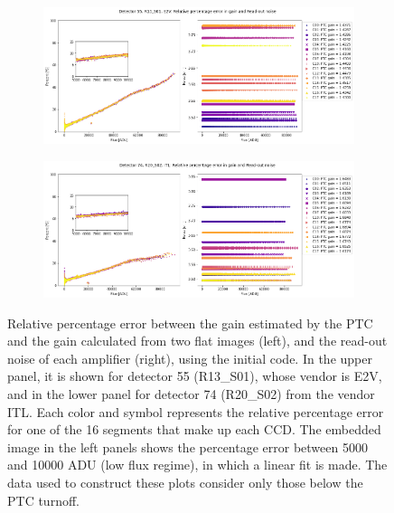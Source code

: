  \begin{figure}[!htb]
     \centering
     \begin{subfigure}[b]{\textwidth}
         \centering
         \includegraphics[width=\textwidth]{Figures/Relative_Error_Gain_Noise_detectorR13_S01_old.png}
     \end{subfigure}
     \vspace{3mm}
     \begin{subfigure}[b]{\textwidth}
         \centering
         \includegraphics[width=\textwidth]{Figures/Relative_Error_Gain_Noise_detectorR20_S02_old.png}
     \end{subfigure}
        \caption{Relative percentage error between the gain estimated by the PTC and the gain calculated from two flat images (left), and the read-out noise of each amplifier (right), using the initial code. In the upper panel, it is shown for detector 55 (R13\_S01), whose vendor is E2V, and in the lower panel for detector 74 (R20\_S02) from the vendor ITL. Each color and symbol represents the relative percentage error for one of the 16 segments that make up each CCD. The embedded image in the left panels shows the percentage error between 5000 and 10000 ADU (low flux regime), in which a linear fit is made. The data used to construct these plots consider only those below the PTC turnoff.}
        \label{fig:relative_error_oldcode}
\end{figure}


